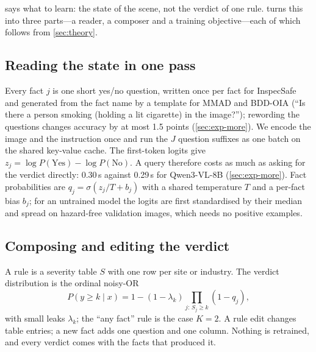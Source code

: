 \section{\lux}
\label{sec:method}


 says what to learn: the state of the scene, not the verdict of one rule. \lux turns this into three parts---a reader, a composer and a training objective---each of which follows from \cref{sec:theory}.

\subsection{Reading the state in one pass}
\label{sec:method-read}
Every fact $j$ is one short yes/no question, written once per fact for InspecSafe and generated from the fact name by a template for MMAD and BDD-OIA (\eg ``Is there a person smoking (holding a lit cigarette) in the image?''); rewording the questions changes accuracy by at most 1.5 points (\cref{sec:exp-more}). We encode the image and the instruction once and run the $J$ question suffixes as one batch on the shared key-value cache. The first-token logits give $z_j=\log P(\text{Yes})-\log P(\text{No})$. A query therefore costs as much as asking for the verdict directly: 0.30\,s against 0.29\,s for Qwen3-VL-8B (\cref{sec:exp-more}). Fact probabilities are $q_j=\sigma(z_j/T+b_j)$ with a shared temperature $T$ and a per-fact bias $b_j$; for an untrained model the logits are first standardised by their median and spread on hazard-free validation images, which needs no positive examples.

\subsection{Composing and editing the verdict}
A rule is a severity table $S$ with one row per site or industry. The verdict distribution is the ordinal noisy-OR
\begin{equation}
P(y\ge k\mid x)=1-(1-\lambda_k)\prod_{j:\,S_j\ge k}(1-q_j),
\label{eq:compose}
\end{equation}
with small leaks $\lambda_k$; the ``any fact'' rule is the case $K=2$. A rule edit changes table entries; a new fact adds one question and one column. Nothing is retrained, and every verdict comes with the facts that produced it.

